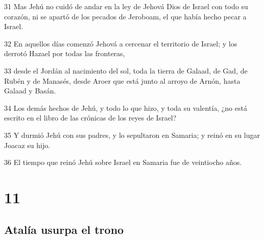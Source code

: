 \par 31 Mas Jehú no cuidó de andar en la ley de Jehová Dios de Israel con todo su corazón, ni se apartó de los pecados de Jeroboam, el que había hecho pecar a Israel.
\par 32 En aquellos días comenzó Jehová a cercenar el territorio de Israel; y los derrotó Hazael por todas las fronteras,
\par 33 desde el Jordán al nacimiento del sol, toda la tierra de Galaad, de Gad, de Rubén y de Manasés, desde Aroer que está junto al arroyo de Arnón, hasta Galaad y Basán.
\par 34 Los demás hechos de Jehú, y todo lo que hizo, y toda su valentía, ¿no está escrito en el libro de las crónicas de los reyes de Israel?
\par 35 Y durmió Jehú con sus padres, y lo sepultaron en Samaria; y reinó en su lugar Joacaz su hijo.
\par 36 El tiempo que reinó Jehú sobre Israel en Samaria fue de veintiocho años.

\chapter{11}

\section*{Atalía usurpa el trono}

